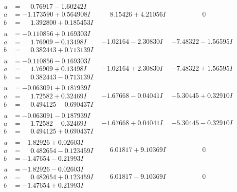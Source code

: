 \documentclass[1p]{elsarticle_modified}
\theoremstyle{definition}
\begin{document}
$$\begin{array}{c|c|c}
\begin{aligned}
u &= \phantom{-}0.76917 - 1.60242 I \\
a &= -1.173590 + 0.564908 I \\
b &= \phantom{-}1.392800 + 0.185453 I\end{aligned}
 & \phantom{-}8.15426 + 4.21056 I & \phantom{-0.000000 } 0 \\ \hline\begin{aligned}
u &= -0.110856 + 0.169303 I \\
a &= \phantom{-}1.76909 - 0.13498 I \\
b &= \phantom{-}0.382443 + 0.713139 I\end{aligned}
 & -1.02164 - 2.30830 I & -7.48322 - 1.56595 I \\ \hline\begin{aligned}
u &= -0.110856 - 0.169303 I \\
a &= \phantom{-}1.76909 + 0.13498 I \\
b &= \phantom{-}0.382443 - 0.713139 I\end{aligned}
 & -1.02164 + 2.30830 I & -7.48322 + 1.56595 I \\ \hline\begin{aligned}
u &= -0.063091 + 0.187939 I \\
a &= \phantom{-}1.72582 + 0.32469 I \\
b &= \phantom{-}0.494125 - 0.690437 I\end{aligned}
 & -1.67668 - 0.04041 I & -5.30445 + 0.32910 I \\ \hline\begin{aligned}
u &= -0.063091 - 0.187939 I \\
a &= \phantom{-}1.72582 - 0.32469 I \\
b &= \phantom{-}0.494125 + 0.690437 I\end{aligned}
 & -1.67668 + 0.04041 I & -5.30445 - 0.32910 I \\ \hline\begin{aligned}
u &= -1.82926 + 0.02603 I \\
a &= \phantom{-}0.482654 - 0.123459 I \\
b &= -1.47654 - 0.21993 I\end{aligned}
 & \phantom{-}6.01817 + 9.10369 I & \phantom{-0.000000 } 0 \\ \hline\begin{aligned}
u &= -1.82926 - 0.02603 I \\
a &= \phantom{-}0.482654 + 0.123459 I \\
b &= -1.47654 + 0.21993 I\end{aligned}
 & \phantom{-}6.01817 - 9.10369 I & \phantom{-0.000000 } 0 \\ \hline\begin{aligned}

\end{aligned}
\end{array}$$
\end{document}
